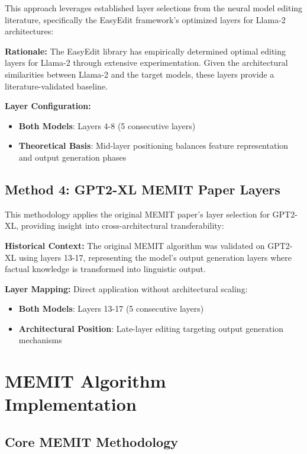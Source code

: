 This approach leverages established layer selections from the neural model editing literature, specifically the EasyEdit framework's optimized layers for Llama-2 architectures:

\textbf{Rationale:} The EasyEdit library has empirically determined optimal editing layers for Llama-2 through extensive experimentation. Given the architectural similarities between Llama-2 and the target models, these layers provide a literature-validated baseline.

\textbf{Layer Configuration:}
\begin{itemize}
    \item \textbf{Both Models}: Layers 4-8 (5 consecutive layers)
    \item \textbf{Theoretical Basis}: Mid-layer positioning balances feature representation and output generation phases
\end{itemize}

\subsection{Method 4: GPT2-XL MEMIT Paper Layers}

This methodology applies the original MEMIT paper's layer selection for GPT2-XL, providing insight into cross-architectural transferability:

\textbf{Historical Context:} The original MEMIT algorithm was validated on GPT2-XL using layers 13-17, representing the model's output generation layers where factual knowledge is transformed into linguistic output.

\textbf{Layer Mapping:} Direct application without architectural scaling:
\begin{itemize}
    \item \textbf{Both Models}: Layers 13-17 (5 consecutive layers)
    \item \textbf{Architectural Position}: Late-layer editing targeting output generation mechanisms
\end{itemize}

\section{MEMIT Algorithm Implementation}

\subsection{Core MEMIT Methodology}

